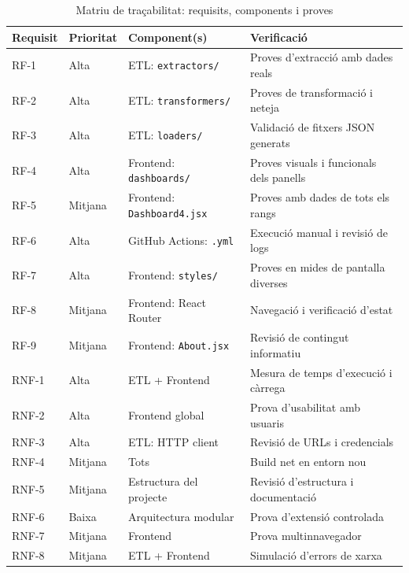 \begin{table}[ht]
\centering
\caption{Matriu de traçabilitat: requisits, components i proves}
\label{tab:traceability}
\small
\begin{tabular}{|l|l|l|l|}
\hline
\textbf{Requisit} & \textbf{Prioritat} & \textbf{Component(s)} & \textbf{Verificació} \\
\hline
RF-1 & Alta & ETL: \texttt{extractors/} & Proves d'extracció amb dades reals \\
\hline
RF-2 & Alta & ETL: \texttt{transformers/} & Proves de transformació i neteja \\
\hline
RF-3 & Alta & ETL: \texttt{loaders/} & Validació de fitxers JSON generats \\
\hline
RF-4 & Alta & Frontend: \texttt{dashboards/} & Proves visuals i funcionals dels panells \\
\hline
RF-5 & Mitjana & Frontend: \texttt{Dashboard4.jsx} & Proves amb dades de tots els rangs \\
\hline
RF-6 & Alta & GitHub Actions: \texttt{.yml} & Execució manual i revisió de logs \\
\hline
RF-7 & Alta & Frontend: \texttt{styles/} & Proves en mides de pantalla diverses \\
\hline
RF-8 & Mitjana & Frontend: React Router & Navegació i verificació d'estat \\
\hline
RF-9 & Mitjana & Frontend: \texttt{About.jsx} & Revisió de contingut informatiu \\
\hline
RNF-1 & Alta & ETL + Frontend & Mesura de temps d'execució i càrrega \\
\hline
RNF-2 & Alta & Frontend global & Prova d'usabilitat amb usuaris \\
\hline
RNF-3 & Alta & ETL: HTTP client & Revisió de URLs i credencials \\
\hline
RNF-4 & Mitjana & Tots & Build net en entorn nou \\
\hline
RNF-5 & Mitjana & Estructura del projecte & Revisió d'estructura i documentació \\
\hline
RNF-6 & Baixa & Arquitectura modular & Prova d'extensió controlada \\
\hline
RNF-7 & Mitjana & Frontend & Prova multinnavegador \\
\hline
RNF-8 & Mitjana & ETL + Frontend & Simulació d'errors de xarxa \\
\hline
\end{tabular}
\end{table}

